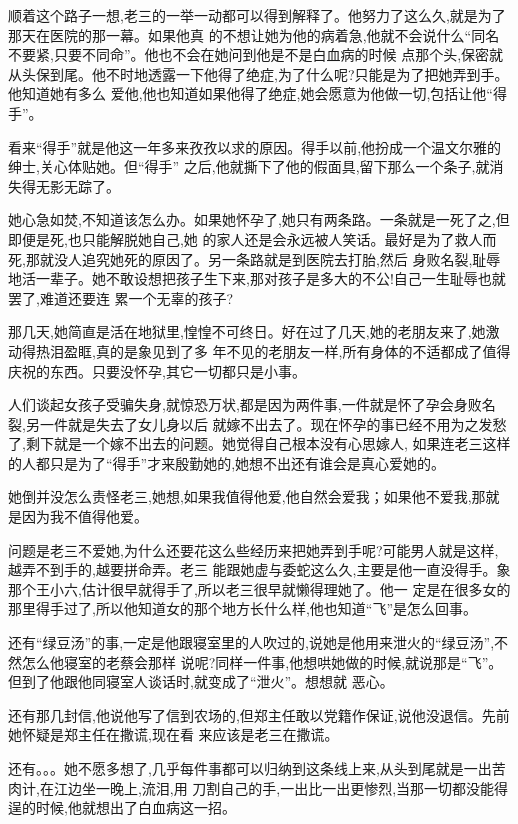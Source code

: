 ﻿\documentclass[12pt]{article}
\begin{document}
顺着这个路子一想,老三的一举一动都可以得到解释了。他努力了这么久,就是为了那天在医院的那一幕。如果他真
的不想让她为他的病着急,他就不会说什么``同名不要紧,只要不同命''。他也不会在她问到他是不是白血病的时候
点那个头,保密就从头保到尾。他不时地透露一下他得了绝症,为了什么呢?只能是为了把她弄到手。他知道她有多么
爱他,他也知道如果他得了绝症,她会愿意为他做一切,包括让他``得手''。

看来``得手''就是他这一年多来孜孜以求的原因。得手以前,他扮成一个温文尔雅的绅士,关心体贴她。但``得手''
之后,他就撕下了他的假面具,留下那么一个条子,就消失得无影无踪了。

她心急如焚,不知道该怎么办。如果她怀孕了,她只有两条路。一条就是一死了之,但即便是死,也只能解脱她自己,她
的家人还是会永远被人笑话。最好是为了救人而死,那就没人追究她死的原因了。另一条路就是到医院去打胎,然后
身败名裂,耻辱地活一辈子。她不敢设想把孩子生下来,那对孩子是多大的不公!自己一生耻辱也就罢了,难道还要连
累一个无辜的孩子?

那几天,她简直是活在地狱里,惶惶不可终日。好在过了几天,她的老朋友来了,她激动得热泪盈眶,真的是象见到了多
年不见的老朋友一样,所有身体的不适都成了值得庆祝的东西。只要没怀孕,其它一切都只是小事。

人们谈起女孩子受骗失身,就惊恐万状,都是因为两件事,一件就是怀了孕会身败名裂,另一件就是失去了女儿身以后
就嫁不出去了。现在怀孕的事已经不用为之发愁了,剩下就是一个嫁不出去的问题。她觉得自己根本没有心思嫁人,
如果连老三这样的人都只是为了``得手''才来殷勤她的,她想不出还有谁会是真心爱她的。

她倒并没怎么责怪老三,她想,如果我值得他爱,他自然会爱我；如果他不爱我,那就是因为我不值得他爱。

问题是老三不爱她,为什么还要花这么些经历来把她弄到手呢?可能男人就是这样,越弄不到手的,越要拼命弄。老三
能跟她虚与委蛇这么久,主要是他一直没得手。象那个王小六,估计很早就得手了,所以老三很早就懒得理她了。他一
定是在很多女的那里得手过了,所以他知道女的那个地方长什么样,他也知道``飞''是怎么回事。

还有``绿豆汤''的事,一定是他跟寝室里的人吹过的,说她是他用来泄火的``绿豆汤'',不然怎么他寝室的老蔡会那样
说呢?同样一件事,他想哄她做的时候,就说那是``飞''。但到了他跟他同寝室人谈话时,就变成了``泄火''。想想就
恶心。

还有那几封信,他说他写了信到农场的,但郑主任敢以党籍作保证,说他没退信。先前她怀疑是郑主任在撒谎,现在看
来应该是老三在撒谎。

还有。。。她不愿多想了,几乎每件事都可以归纳到这条线上来,从头到尾就是一出苦肉计,在江边坐一晚上,流泪,用
刀割自己的手,一出比一出更惨烈,当那一切都没能得逞的时候,他就想出了白血病这一招。
\end{document}
